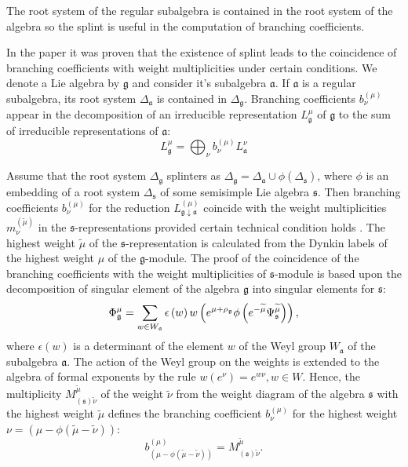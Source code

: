 \documentclass[12pt]{article}
\newcommand{\gf}{\mathfrak{g}}
\newcommand{\af}{\mathfrak{a}}
\newcommand{\sfr}{\mathfrak{s}}
\begin{document}
The root system of the regular subalgebra is contained in the root system of the algebra so the splint is useful in the
computation of branching coefficients. 

In the paper \cite{2011arXiv1111.6787L} it was proven that the existence of splint leads to the
coincidence of branching coefficients with weight multiplicities under certain conditions. We denote a
Lie algebra by $\gf$ and consider it's subalgebra $\af$. If $\af$ is a regular subalgebra, its root
system $\Delta_{\af}$ is contained in $\Delta_{\gf}$. Branching coefficients $b^{(\mu)}_{\nu}$
appear in the decomposition of an irreducible representation $L^{\mu}_{\gf}$ of $\gf$ to the sum of
irreducible representations of $\af$:
\begin{equation}
  \label{eq:1}
  L^{\mu}_{\gf}=\bigoplus_{\nu} b^{(\mu)}_{\nu} L^{\nu}_{\af}
\end{equation}

Assume that the root system $\Delta_{\gf}$ splinters as $\Delta_{\gf}=\Delta_{\af} \cup
\phi(\Delta_{\sfr})$, where $\phi$ is an embedding of a root system $\Delta_{\sfr}$ of some semisimple
Lie algebra $\sfr$. Then branching coefficients $b^{(\mu)}_{\nu}$ for the reduction
$L^{(\mu)}_{\gf\downarrow \af}$ coincide with the weight multiplicities $m^{(\tilde \mu)}_{\nu}$ in the $\sfr$-representations provided certain technical condition holds \cite{2011arXiv1111.6787L}.
The highest weight $\tilde\mu$ of the $\sfr$-representation is calculated from the Dynkin labels of the highest
weight $\mu$ of the $\gf$-module.
The proof of the coincidence of the branching coefficients with the weight multiplicities of
$\sfr$-module is based upon the decomposition of singular element of the algebra $\gf$ into singular
elements for $\sfr$:
\begin{equation}
 \Phi ^{\mu }_{\gf} = \sum_{w\in W_{\frak{a}}}\epsilon\left( w\right)w\left( e^{\mu +\rho _{\gf}}\phi\left( e^{-\widetilde{\mu }}\Psi^{\widetilde{\mu }}_{\sfr}\right)\right),
\end{equation}
where $\epsilon\left( w\right)$ is a determinant of the element $w$ of the Weyl group $W_{\af}$ of
the subalgebra $\af$. The action of the Weyl group on the weights is extended to the algebra of formal
exponents by the rule $w\left(e^{\nu}\right)=e^{w\nu}, w\in W$. Hence, the multiplicity $M_{\left(
      \sfr\right) \widetilde{\nu }}^{\widetilde{\mu }}$ of the weight $\widetilde{\nu }$ from the
  weight diagram of the algebra $\sfr$ with the highest weight $\tilde\mu$ defines the branching
  coefficient $b_{\nu }^{(\mu )}$ for the highest weight $\nu =\left( \mu -\phi \left(
      \widetilde{\mu }-\widetilde{\nu }\right) \right) $:
\begin{equation}
b_{\left( \mu -\phi \left( \widetilde{\mu }-\widetilde{\nu }\right) \right)
}^{(\mu )}=M_{\left( \sfr\right) \widetilde{\nu }}^{\widetilde{\mu }}. 
\label{bran1}
\end{equation}
\end{document}
